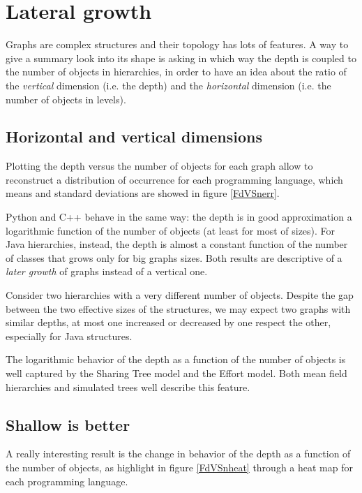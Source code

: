 \section{Lateral growth}
Graphs are complex structures and their topology has lots of features. A way to give a summary look into its shape is asking in which way the depth is coupled to the number of objects in hierarchies, in order to have an idea about the ratio of the \textit{vertical} dimension (i.e. the depth) and the \textit{horizontal} dimension (i.e. the number of objects in levels).

\subsection{Horizontal and vertical dimensions}
Plotting the depth versus the number of objects for each graph allow to reconstruct a distribution of occurrence for each programming language, which means and standard deviations are showed in figure \ref{FdVSnerr}.

Python and C++ behave in the same way: the depth is in good approximation a logarithmic function of the number of objects (at least for most of sizes). For Java hierarchies, instead, the depth is almost a constant function of the number of classes that grows only for big graphs sizes. Both results are descriptive of a \textit{later growth} of graphs instead of a vertical one.

Consider two hierarchies with a very different number of objects. Despite the gap between the two effective sizes of the structures, we may expect two graphs with similar depths, at most one increased or decreased by one respect the other, especially for Java structures.

The logarithmic behavior of the depth as a function of the number of objects is well captured by the Sharing Tree model and the Effort model. Both mean field hierarchies and simulated trees well describe this feature.

\subsection{Shallow is better}
A really interesting result is the change in behavior of the depth as a function of the number of objects, as highlight in figure \ref{FdVSnheat} through a heat map for each programming language. 

